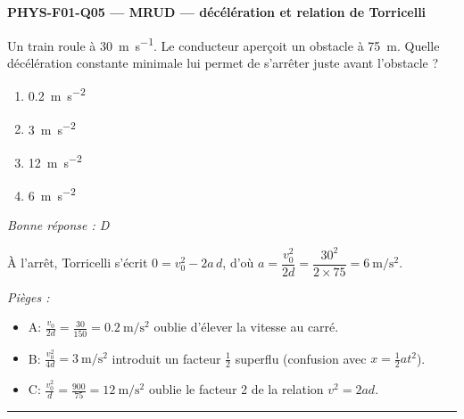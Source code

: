 \documentclass[11pt,a4paper]{article}
\begin{document}
\noindent\textbf{PHYS-F01-Q05 --- MRUD --- décélération et relation de Torricelli}\par
Un train roule à \qty{30}{\metre\per\second}. Le conducteur aperçoit un obstacle à \qty{75}{\metre}. Quelle décélération constante minimale lui permet de s'arrêter juste avant l'obstacle ?
\begin{enumerate}[label=\Alph*)]
\item \qty{0.2}{\metre\per\second\squared}
\item \qty{3}{\metre\per\second\squared}
\item \qty{12}{\metre\per\second\squared}
\item \qty{6}{\metre\per\second\squared}
\end{enumerate}
\textit{Bonne réponse : D}\par
À l'arrêt, Torricelli s'écrit $0=v_0^2-2a\,d$, d'où $a=\dfrac{v_0^2}{2d}=\dfrac{30^2}{2\times 75}=\qty{6}{\metre\per\second\squared}$.\par
\textit{Pièges :}
\begin{itemize}
\item A: $\frac{v_0}{2d}=\frac{30}{150}=\qty{0.2}{\metre\per\second\squared}$ oublie d'élever la vitesse au carré.
\item B: $\frac{v_0^2}{4d}=\qty{3}{\metre\per\second\squared}$ introduit un facteur $\frac12$ superflu (confusion avec $x=\frac12 a t^2$).
\item C: $\frac{v_0^2}{d}=\frac{900}{75}=\qty{12}{\metre\per\second\squared}$ oublie le facteur 2 de la relation $v^2=2ad$.
\end{itemize}
\vspace{8pt}\hrule\vspace{8pt}
\end{document}
